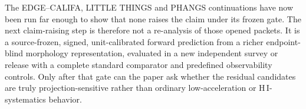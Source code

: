 \documentclass[11pt]{article}
\begin{document}
The EDGE--CALIFA, LITTLE THINGS and PHANGS continuations have now been run far enough to show that none raises the claim under its frozen gate. The next claim-raising step is therefore not a re-analysis of those opened packets. It is a source-frozen, signed, unit-calibrated forward prediction from a richer endpoint-blind morphology representation, evaluated in a new independent survey or release with a complete standard comparator and predefined observability controls. Only after that gate can the paper ask whether the residual candidates are truly projection-sensitive rather than ordinary low-acceleration or H\,I-systematics behavior.



\end{document}
